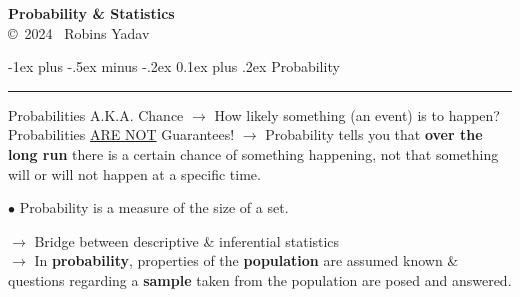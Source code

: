 \documentclass[letterpaper, 10.5pt,landscape]{article}
\makeatletter
\renewcommand{\section}{\@startsection{section}{1}{0mm}%
                                {-1ex plus -.5ex minus -.2ex}%
                                {0.1ex plus .2ex}%
                                {\normalfont\small}}
\makeatother
\begin{document}
\raggedright
\footnotesize

\begin{multicols*}{3}

\setlength{\premulticols}{1pt}
\setlength{\postmulticols}{1pt}
\setlength{\multicolsep}{1pt}
\setlength{\columnsep}{2pt}


\begin{center}
    {\color{teal} \Large{\textbf{Probability \& Statistics}}} \\
   \copyright \ 2024 \  Robins Yadav 
\end{center}














\section{Probability} {\color{teal}\hrule height 1pt} \smallskip

Probabilities A.K.A. Chance $\rightarrow$ How likely something (an event) is to happen? Probabilities \underline{ARE NOT} Guarantees! $\rightarrow$ Probability tells you that \textbf{over the long run} there is a certain chance of something happening, not that something will or will not happen at a specific time.

$\bullet$ Probability is a measure of the size of a set.


$\rightarrow$ Bridge between descriptive \& inferential statistics \\
$\rightarrow$ In \textbf{probability}, properties of the \textbf{population} are assumed known \& questions regarding a \textbf{sample} taken from the population are posed and answered. \\


\end{multicols*}
\end{document}
